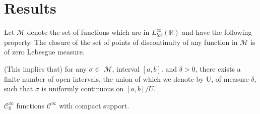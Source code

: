 \documentclass[../main.tex]{subfiles}
\begin{document}
\section{Results}
\begin{definition} Let $\mathcal{M}$ denote the set of functions which are in $L_{loc}^{\infty}(\mathbb{R})$ and have the following property. The closure of the set of points of discontinuity of any function in $\mathcal{M}$ is of zero Lebesgue measure. 
\begin{propo}
(This implies that) for any $\sigma \in$ $\mathcal{M}$, interval $[a,b] .$ and $\delta >0$, there exists a finite number of open intervals, the union of which we denote by U, of measure $\delta$, such that $\sigma$ is uniformly continuous on $[a,b]/U$. 
\end{propo}
\end{definition}

\begin{definition} 
	$ \mathcal{C}^\infty_0$ functions $\mathcal{C}^\infty$ with compact support.  
\end{definition}
\end{document}
